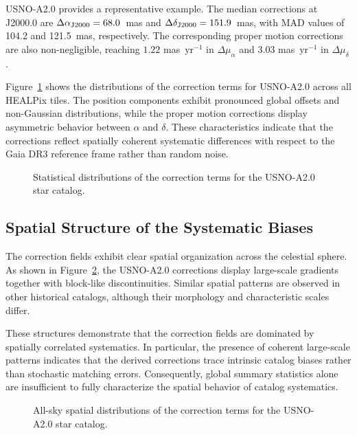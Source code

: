 \documentclass[linenumbers,amsmath,manuscript]{aastex702}
\begin{document}
USNO-A2.0 provides a representative example. The median corrections at J2000.0 are $\Delta\alpha_{\rm J2000} = 68.0$~mas and $\Delta\delta_{\rm J2000} = 151.9$~mas, with MAD values of 104.2 and 121.5~mas, respectively. The corresponding proper motion corrections are also non-negligible, reaching $1.22$ mas~yr$^{-1}$ in $\Delta\mu_{\alpha}$ and $3.03$ mas~yr$^{-1}$ in $\Delta\mu_{\delta}$.

Figure~\ref{fig:hist_usnoa2} shows the distributions of the correction terms for USNO-A2.0 across all HEALPix tiles. The position components exhibit pronounced global offsets and non-Gaussian distributions, while the proper motion corrections display asymmetric behavior between $\alpha$ and $\delta$. These characteristics indicate that the corrections reflect spatially coherent systematic differences with respect to the Gaia DR3 reference frame rather than random noise.

\begin{figure}[ht!]
\caption{Statistical distributions of the correction terms for the USNO-A2.0 star catalog.}
\label{fig:hist_usnoa2}
\end{figure}

\subsection{Spatial Structure of the Systematic Biases} \label{subsec:spatial}

The correction fields exhibit clear spatial organization across the celestial sphere. As shown in Figure~\ref{fig:bias_usno_a2_2x2}, the USNO-A2.0 corrections display large-scale gradients together with block-like discontinuities. Similar spatial patterns are observed in other historical catalogs, although their morphology and characteristic scales differ.

These structures demonstrate that the correction fields are dominated by spatially correlated systematics. In particular, the presence of coherent large-scale patterns indicates that the derived corrections trace intrinsic catalog biases rather than stochastic matching errors. Consequently, global summary statistics alone are insufficient to fully characterize the spatial behavior of catalog systematics.

\begin{figure}[ht!]
\caption{All-sky spatial distributions of the correction terms for the USNO-A2.0 star catalog.}
\label{fig:bias_usno_a2_2x2}
\end{figure}
\end{document}
